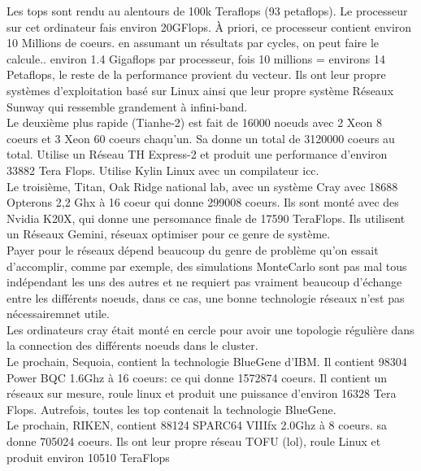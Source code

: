 \documentclass[oneside]{book}
\begin{document}
Les tops sont rendu au alentours de 100k Teraflops (93 petaflops). Le processeur sur cet ordinateur fais environ 20GFlops. À priori, ce processeur contient environ 10 Millions de coeurs. en assumant un résultats par cycles, on peut faire le calcule.. environ 1.4 Gigaflops par processeur, fois 10 millions = environs 14 Petaflops, le reste de la performance provient du vecteur. Ils ont leur propre systèmes d'exploitation basé sur Linux ainsi que leur propre système Réseaux Sunway qui ressemble grandement à infini-band.\\

Le deuxième plus rapide (Tianhe-2) est fait de 16000 noeuds avec 2 Xeon 8 coeurs et 3 Xeon 60 coeurs chaqu'un. Sa donne un total de 3120000 coeurs au total. Utilise un Réseau TH Express-2 et produit une performance d'environ 33882 Tera Flops. Utilise Kylin Linux avec un compilateur icc.\\

Le troisième, Titan, Oak Ridge national lab, avec un système Cray avec 18688 Opterons 2,2 Ghx à 16 coeur qui donne 299008 coeurs. Ils sont monté avec des Nvidia K20X, qui donne une persomance finale de 17590 TeraFlops. Ils utilisent un Réseaux Gemini, réseuax optimiser pour ce genre de système. \\

Payer pour le réseaux dépend beaucoup du genre de problème qu'on essait d'accomplir, comme par exemple, des simulations MonteCarlo sont pas mal tous indépendant les uns des autres et ne requiert pas vraiment beaucoup d'échange entre les différents noeuds, dans ce cas, une bonne technologie réseaux n'est pas nécessairemnet utile.\\

Les ordinateurs cray était monté en cercle pour avoir une topologie régulière dans la connection des différents noeuds dans le cluster.\\

Le prochain, Sequoia, contient la technologie BlueGene d'IBM. Il contient 98304 Power BQC 1.6Ghz à 16 coeurs: ce qui donne 1572874 coeurs. Il contient un réseaux sur mesure, roule linux et produit une puissance d'environ 16328 Tera Flops. Autrefois, toutes les top contenait la technologie BlueGene.\\

Le prochain, RIKEN, contient 88124 SPARC64 VIIIfx 2.0Ghz à 8 coeurs. sa donne 705024 coeurs. Ils ont leur propre réseau TOFU (lol), roule Linux et produit environ 10510 TeraFlops\\
\end{document}
